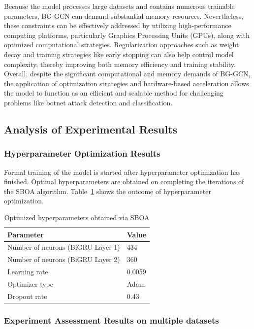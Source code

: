 \documentclass[a4paper,fleqn]{cas-sc}
\begin{document}
Because the model processes large datasets and contains numerous trainable parameters, BG-GCN can demand substantial memory resources. Nevertheless, these constraints can be effectively addressed by utilizing high-performance computing platforms, particularly Graphics Processing Units (GPUs), along with optimized computational strategies. Regularization approaches such as weight decay and training strategies like early stopping can also help control model complexity, thereby improving both memory efficiency and training stability.
Overall, despite the significant computational and memory demands of BG-GCN, the application of optimization strategies and hardware-based acceleration allows the model to function as an efficient and scalable method for challenging problems like botnet attack detection and classification.


\subsection{Analysis of Experimental Results}

\subsubsection{Hyperparameter Optimization Results}
Formal training of the model is started after hyperparameter optimization has finished. Optimal hyperparameters are obtained on completing the iterations of the SBOA algorithm. Table~\ref{tab:hyperparams} shows the outcome of hyperparameter optimization.
\begin{table}[htbp]
\caption{Optimized hyperparameters obtained via SBOA}\label{tab:hyperparams}
\centering
\begin{tabular}{@{}ll@{}}
\toprule
Parameter & Value \\
\midrule
Number of neurons (BiGRU Layer 1) & 434 \\
Number of neurons (BiGRU Layer 2) & 360 \\
Learning rate & 0.0059 \\
Optimizer type & Adam \\
Dropout rate & 0.43 \\
\bottomrule
\end{tabular}
\end{table}

\subsubsection{Experiment Assessment Results on multiple datasets}
\end{document}
